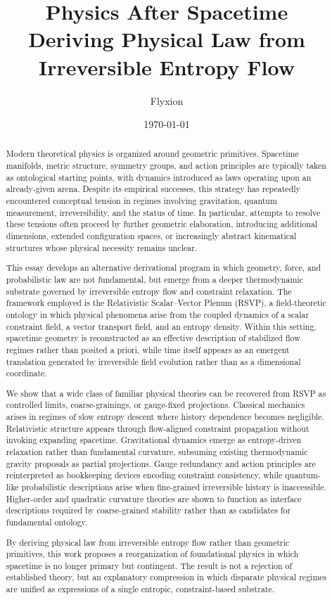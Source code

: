 \documentclass[11pt]{article}
\title{Physics After Spacetime\\
\large Deriving Physical Law from Irreversible Entropy Flow}
\author{Flyxion}
\date{\today}
\begin{document}
\maketitle

\begin{abstract}
Modern theoretical physics is organized around geometric primitives. Spacetime manifolds, metric structure, symmetry groups, and action principles are typically taken as ontological starting points, with dynamics introduced as laws operating upon an already-given arena. Despite its empirical successes, this strategy has repeatedly encountered conceptual tension in regimes involving gravitation, quantum measurement, irreversibility, and the status of time. In particular, attempts to resolve these tensions often proceed by further geometric elaboration, introducing additional dimensions, extended configuration spaces, or increasingly abstract kinematical structures whose physical necessity remains unclear.

This essay develops an alternative derivational program in which geometry, force, and probabilistic law are not fundamental, but emerge from a deeper thermodynamic substrate governed by irreversible entropy flow and constraint relaxation. The framework employed is the Relativistic Scalar--Vector Plenum (RSVP), a field-theoretic ontology in which physical phenomena arise from the coupled dynamics of a scalar constraint field, a vector transport field, and an entropy density. Within this setting, spacetime geometry is reconstructed as an effective description of stabilized flow regimes rather than posited a priori, while time itself appears as an emergent translation generated by irreversible field evolution rather than as a dimensional coordinate.

We show that a wide class of familiar physical theories can be recovered from RSVP as controlled limits, coarse-grainings, or gauge-fixed projections. Classical mechanics arises in regimes of slow entropy descent where history dependence becomes negligible. Relativistic structure appears through flow-aligned constraint propagation without invoking expanding spacetime. Gravitational dynamics emerge as entropy-driven relaxation rather than fundamental curvature, subsuming existing thermodynamic gravity proposals as partial projections. Gauge redundancy and action principles are reinterpreted as bookkeeping devices encoding constraint consistency, while quantum-like probabilistic descriptions arise when fine-grained irreversible history is inaccessible. Higher-order and quadratic curvature theories are shown to function as interface descriptions required by coarse-grained stability rather than as candidates for fundamental ontology.

By deriving physical law from irreversible entropy flow rather than geometric primitives, this work proposes a reorganization of foundational physics in which spacetime is no longer primary but contingent. The result is not a rejection of established theory, but an explanatory compression in which disparate physical regimes are unified as expressions of a single entropic, constraint-based substrate.
\end{abstract}
\end{document}
